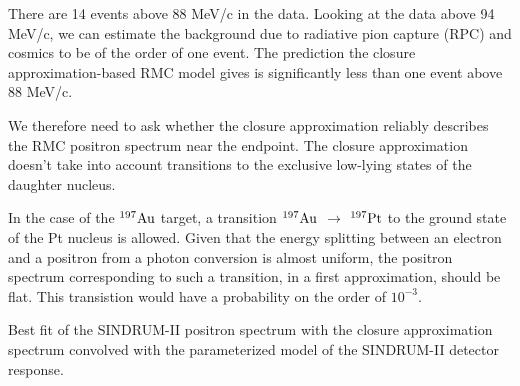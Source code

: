 \documentclass[12pt]{article}
\newcommand {\ra}        {\rightarrow}
\newcommand {\Au}[1]     {\mbox{$\rm ^{#1}Au$}}                 %
\begin{document}
There are 14 events above 88 MeV/c in the data.
Looking at the data above 94 MeV/c, we can estimate the background due to radiative
pion capture (RPC) and cosmics to be of the order of one event.
The prediction the closure approximation-based RMC model gives is significantly less
than one event above 88 MeV/c. 

We therefore need to ask whether the closure approximation reliably
describes the RMC positron spectrum near the endpoint. The closure approximation
doesn't take into account transitions to the exclusive low-lying states of the daughter
nucleus.

In the case of the \Au{197} target, a transition \Au{197} $\ra$ $^{197} \rm Pt$ to
the ground state of the Pt nucleus is allowed. Given that the energy splitting between
an electron and a positron from a photon conversion is almost uniform,
the positron spectrum corresponding to such a transition, in a first approximation,
should be flat. This transistion would have a probability on the order of $10^{-3}$.

\vspace{0.1in}
 {
  \label{fig:ana_step2_ppos_best_fit}
  Best fit of the SINDRUM-II positron spectrum with the closure approximation
  spectrum convolved with the parameterized model of the SINDRUM-II detector
  response.
}
\vspace{0.1in}
\end{document}
